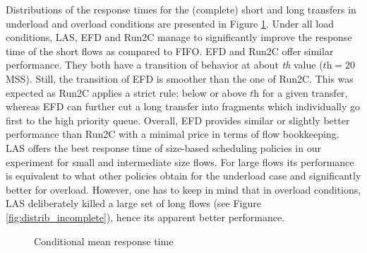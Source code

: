 \documentclass[preprint,12pt]{elsarticle}
\begin{document}
Distributions of the response times for the (complete) short and long transfers in underload and overload conditions are presented in Figure \ref{fig:resp_time}. Under all load conditions, LAS, EFD and Run2C manage to significantly improve the response time of the short flows as compared to FIFO. EFD and Run2C offer similar performance. They both have a transition of behavior at about \textit{th} value ($\textit{th}=20$ MSS). Still, the transition of EFD is smoother than the one of Run2C. This was expected as Run2C applies a strict rule: below or above $\textit{th}$ for a given transfer, whereas EFD can further cut a long transfer into fragments which individually go first to the high priority queue. Overall, EFD provides similar or slightly better performance than Run2C with a minimal price in terms of flow bookkeeping. LAS offers the best response time of size-based scheduling policies in our experiment for small and intermediate size flows. For large flows its performance is equivalent to what other policies obtain for the underload case and significantly better for overload. However, one has to keep in mind that in overload conditions, LAS deliberately killed a large set of long flows (see Figure \ref{fig:distrib_incomplete}), hence its apparent better performance.   


\begin{figure}[ht]
  \centering
  \caption{Conditional mean response time}
  \label{fig:resp_time}
\end{figure}
\end{document}
